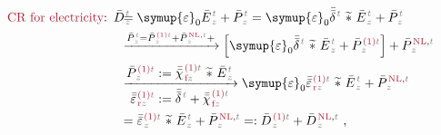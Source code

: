 \begin{subequations} \label{eq:cr-d}
\begin{align}
	\textcolor{Maroon}{\text{CR for electricity}}\text{:}&\hspace{0.5em} \bar{D}^{\;\!\mathcolor{gray}{t}}_{\;\!\mathcolor{gray}{z}} \hspace{-2.0em} &&= {\symup{\varepsilon}}_0 \bar{E}^{\;\!\mathcolor{gray}{t}}_{\;\!\mathcolor{gray}{z}} + \bar{P}^{\;\!\mathcolor{gray}{t}}_{\;\!\mathcolor{gray}{z}} = {\symup{\varepsilon}}_0 \bar{\bar{\delta}}^{\;\!\mathcolor{gray}{t}}~\widetilde *~\bar{E}^{\;\!\mathcolor{gray}{t}}_{\;\!\mathcolor{gray}{z}} + \bar{P}^{\;\!\mathcolor{gray}{t}}_{\;\!\mathcolor{gray}{z}} \label{cr-d1} \\ 
	& &&\xrightarrow[]{\bar{P}^{\;\!\mathcolor{gray}{t}}_{\;\!\mathcolor{gray}{z}} = \bar{P}^{\;\!\textcolor{Maroon}{\text{(1)}} \mathcolor{gray}{t}}_{\;\!\mathcolor{gray}{z}} + \bar{P}^{\;\!\textcolor{Maroon}{\text{NL}}, \mathcolor{gray}{t}}_{\;\!\mathcolor{gray}{z}} + } \left[ {\symup{\varepsilon}}_0 \bar{\bar{\delta}}^{\;\!\mathcolor{gray}{t}}~\widetilde *~\bar{E}^{\;\!\mathcolor{gray}{t}}_{\;\!\mathcolor{gray}{z}} + \bar{P}^{\;\!\textcolor{Maroon}{\text{(1)}} \mathcolor{gray}{t}}_{\;\!\mathcolor{gray}{z}} \right] + \bar{P}^{\;\!\textcolor{Maroon}{\text{NL}}, \mathcolor{gray}{t}}_{\;\!\mathcolor{gray}{z}} \label{cr-d2} \\ 
	& &&\xrightarrow[\displaystyle{ \bar{\bar{\varepsilon}}^{\;\!\textcolor{Maroon}{\text{(1)}} \mathcolor{gray}{t}}_{\;\!\textcolor{Maroon}{\text{r}}\mathcolor{gray}{z}} := \bar{\bar{\delta}}^{\;\!\mathcolor{gray}{t}} + \bar{\bar{\chi}}^{\;\!\textcolor{Maroon}{\text{(1)}}\mathcolor{gray}{t}}_{\;\!\textcolor{Maroon}{\text{f}} \mathcolor{gray}{z}}}]{\displaystyle{\bar{P}^{\;\!\textcolor{Maroon}{\text{(1)}} \mathcolor{gray}{t}}_{\;\!\mathcolor{gray}{z}} := \bar{\bar{\chi}}^{\;\!\textcolor{Maroon}{\text{(1)}}\mathcolor{gray}{t}}_{\;\!\textcolor{Maroon}{\text{f}} \mathcolor{gray}{z}} ~\widetilde *~\bar{E}^{\;\!\mathcolor{gray}{t}}_{\;\!\mathcolor{gray}{z}}}} {\symup{\varepsilon}}_0 \bar{\bar{\varepsilon}}^{\;\!\textcolor{Maroon}{\text{(1)}} \mathcolor{gray}{t}}_{\;\!\textcolor{Maroon}{\text{r}}\mathcolor{gray}{z}}~\widetilde *~\bar{E}^{\;\!\mathcolor{gray}{t}}_{\;\!\mathcolor{gray}{z}} + \bar{P}^{\;\!\textcolor{Maroon}{\text{NL}}, \mathcolor{gray}{t}}_{\;\!\mathcolor{gray}{z}} \label{cr-d3} \\ 
	& &&= \bar{\bar{\varepsilon}}^{\;\!\textcolor{Maroon}{\text{(1)}} \mathcolor{gray}{t}}_{\;\!\mathcolor{gray}{z}}~\widetilde *~\bar{E}^{\;\!\mathcolor{gray}{t}}_{\;\!\mathcolor{gray}{z}} + \bar{P}^{\;\!\textcolor{Maroon}{\text{NL}}, \mathcolor{gray}{t}}_{\;\!\mathcolor{gray}{z}} =: \bar{D}^{\;\!\textcolor{Maroon}{\text{(1)}} \mathcolor{gray}{t}}_{\;\!\mathcolor{gray}{z}} + \bar{D}^{\;\!\textcolor{Maroon}{\text{NL}}, \mathcolor{gray}{t}}_{\;\!\mathcolor{gray}{z}}~, \label{cr-d4}
\end{align}
\end{subequations}
